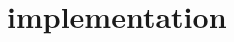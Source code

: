\documentclass[../structure.tex]{subfiles}
\begin{document}
\chapter{implementation}
\end{document}
